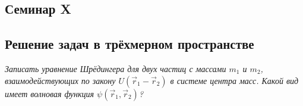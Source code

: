 \begin{center}
    \section{Семинар X}
\end{center}
\subsection{Решение задач в трёхмерном пространстве}
\begin{center}
    \textit{Записать уравнение Шрёдингера для двух частиц с массами $m_1$ и $m_2$, взаимодействующих по закону $U(\Vec{r}_1 - \Vec{r}_2)$ в системе центра масс. Какой вид имеет волновая функция $\psi(\Vec{r}_1, \Vec{r}_2)$?}
\end{center}

